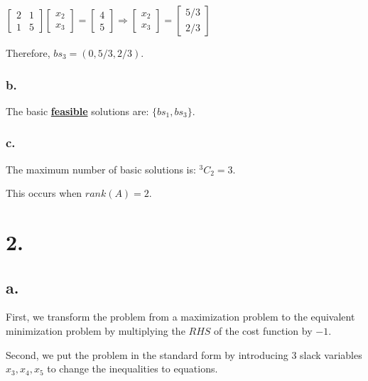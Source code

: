 \documentclass{article}
\begin{document}
\noindent
\newline
$
\begin{bmatrix}
  2 & 1 \\
  1 & 5
\end{bmatrix}
\begin{bmatrix}
  x_2 \\
  x_3
\end{bmatrix}
=
\begin{bmatrix}
 4 \\
 5 
\end{bmatrix}
\Rightarrow
\begin{bmatrix}
  x_2 \\
  x_3
\end{bmatrix}
=
\begin{bmatrix}
  5/3 \\
  2/3
\end{bmatrix}
$
\newline

\noindent
Therefore, $bs_3 = (0, 5/3, 2/3)$.
\newline


\subsubsection*{b.}
The basic \textbf{\underline{feasible}} solutions are: $\{bs_1, bs_3\}$.

\subsubsection*{c.}
The maximum number of basic solutions is: $^3C_2 = 3$.

\noindent
This occurs when $rank(A) = 2$.
\newline

\section*{2.}
\subsection*{a.}
First, we transform the problem from a maximization problem to the equivalent minimization problem by multiplying the $RHS$ of the cost function by $-1$.
\newline

\noindent
Second, we put the problem in the standard form by introducing 3 slack variables $x_3, x_4, x_5$ to change the inequalities to equations. 
\newline
\end{document}
